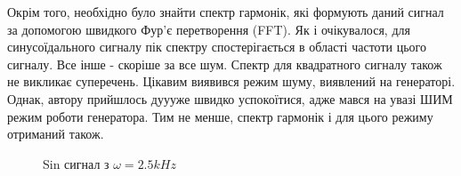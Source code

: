 Окрім того, необхідно було знайти спектр гармонік, які формують даний сигнал за допомогою швидкого Фур'є перетворення (FFT). Як і очікувалося, для синусоїдального сигналу пік спектру спостерігається в області частоти цього сигналу. Все інше - скоріше за все шум. Спектр для квадратного сигналу також не викликає суперечень. Цікавим виявився режим шуму, виявлений на генераторі. Однак, автору прийшлось дуууже швидко успокоїтися, адже мався на увазі ШИМ режим роботи генератора. Тим не менше, спектр гармонік і для цього режиму отриманий також.
\begin{figure}[h]
	\begin{minipage}[h]{0.47\linewidth}
		 Sin сигнал з $\omega=2.5 kHz$ \\
	\end{minipage}
	\hfill
	\begin{minipage}[h]{0.47\linewidth}

\end{minipage}
\end{figure}
